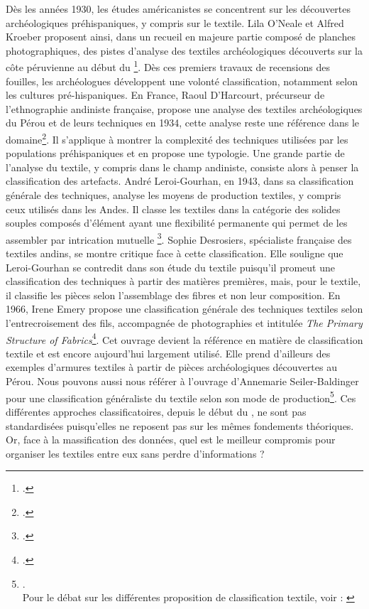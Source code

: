 Dès les années 1930, les études américanistes se concentrent sur les découvertes archéologiques préhispaniques, y compris sur le textile. Lila O'Neale et Alfred Kroeber proposent ainsi, dans un recueil en majeure partie composé de planches photographiques, des pistes d'analyse des textiles archéologiques découverts sur la côte péruvienne au début du \footcite{onealeTextilePeriodsAncient1930}. 
Dès ces premiers travaux de recensions des fouilles, les archéologues développent une volonté classification, notamment selon les cultures pré-hispaniques. En France, Raoul D'Harcourt, précurseur de l'ethnographie andiniste française, propose une analyse des textiles archéologiques du Pérou et de leurs techniques en 1934, cette analyse reste une référence dans le domaine\footcite{harcourtTextilesAnciensPerou2008}. Il s'applique à montrer la complexité des techniques utilisées par les populations préhispaniques et en propose une typologie. Une grande partie de l'analyse du textile, y compris dans le champ andiniste, consiste alors à penser la classification des artefacts. André Leroi-Gourhan, en 1943, dans sa classification générale des techniques, analyse les moyens de production textiles, y compris ceux utilisés dans les Andes. Il classe les textiles dans la catégorie des \og solides souples \fg\:composés d'élément ayant une \og flexibilité permanente qui permet de les assembler par intrication mutuelle \fg \footcite[p.~243]{leroi-gourhanHommeMatiereEvolution1943}. 
Sophie Desrosiers, spécialiste française des textiles andins, se montre critique face à cette classification. Elle souligne que Leroi-Gourhan se contredit dans son étude du textile puisqu'il promeut une classification des techniques à partir des matières premières, mais, pour le textile, il classifie les pièces selon l'assemblage des fibres et non leur composition. En 1966, Irene Emery propose une classification générale des techniques textiles selon l'entrecroisement des fils, accompagnée de photographies et intitulée \textit{The Primary Structure of Fabrics}\footcite{emeryPrimaryStructuresFabrics1995}. Cet ouvrage devient la référence en matière de classification textile et est encore aujourd'hui largement utilisé. Elle prend d'ailleurs des exemples d'armures textiles à partir de pièces archéologiques découvertes au Pérou. Nous pouvons aussi nous référer à l'ouvrage d'Annemarie Seiler-Baldinger pour une classification généraliste du textile selon son mode de production\footnote{\cite{seiler-baldingerTextilesClassificationTechniques1995}.\\Pour le débat sur les différentes proposition de classification textile, voir : \cite{balfetOuSontClassifications1988}}. Ces différentes approches classificatoires, depuis le début du , ne sont pas standardisées puisqu'elles ne reposent pas sur les mêmes fondements théoriques. Or, face à la massification des données, quel est le meilleur compromis pour organiser les textiles entre eux sans perdre d'informations ? 

